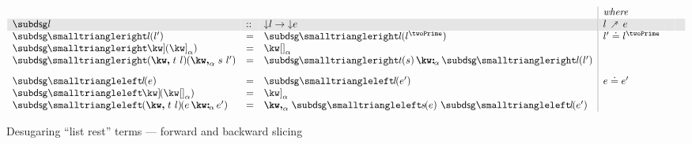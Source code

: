 \begin{figure}[H]
\small
$\begin{array}{lll|llll}
   \arrayrulecolor{lightgray}
   &&&\textit{where}
   \\
   \rowcolor{verylightgray}
   \desugarGC{l} &::& \Below{l} \to \Below{e}
   & l \desugarFwd e
   &&
   \\
   \desugarFwdF{l}(l')
   &=&
   \desugarFwdF{l}(l^\twoPrime)
   &
   l' \eq l^\twoPrime
   \\
   \desugarFwdF{\exListEnd}(\annot{\exListEnd}{\alpha})
   &=&
   \annot{\exNil}{\alpha}
   \\
   \desugarFwdF{(\exListNext{t}{l})}(\annListNext{s}{l'}{\alpha})
   &=&
   \annCons{\desugarFwdF{t}(s)}{\desugarFwdF{l}(l')}{\alpha}
   \\[3mm]
   \desugarBwdF{l}(e)
   &=&
   \desugarBwdF{l}(e')
   &
   e \eq e'
   \\
   \desugarBwdF{\exListEnd}(\annot{\exNil}{\alpha})
   &=&
   \annot{\exListEnd}{\alpha}
   \\
   \desugarBwdF{(\exListNext{t}{l})}(\annCons{e}{e'}{\alpha})
   &=&
   \annListNext{\desugarBwdF{s}(e)}{\desugarBwdF{l}(e')}{\alpha}
\end{array}$
\caption{Desugaring ``list rest'' terms --- forward and backward slicing}
\end{figure}
